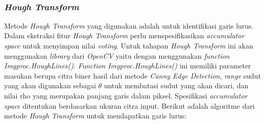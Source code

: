 \begin{enumerate}[leftmargin=16pt]
\begin{adjustbox}{width=1\textwidth}
\begin{minipage}{\linewidth}
			\label{fig:HasilDeteksiTepi}
		\end{minipage}
	\end{adjustbox}\\
\end{enumerate}

\subsubsection{\textit{Hough Transform}}
\noindent Metode \textit{Hough Transform} yang digunakan adalah untuk identifikasi garis lurus. Dalam ekstraksi fitur \textit{Hough Transform} perlu menspesifikasikan \textit{accumulator space} untuk menyimpan nilai \textit{voting}. Untuk tahapan \textit{Hough Transform} ini akan menggunakan \textit{library} dari \textit{OpenCV} yaitu dengan menggunakan \textit{function} \textit{Imgproc.HoughLines()}. \textit{Function} \textit{Imgproc.HoughLines()} ini memiliki parameter masukan berupa citra biner hasil dari metode \textit{Canny Edge Detection}, \textit{range} sudut yang akan digunakan sebagai $\theta$ untuk membatasi sudut yang akan dicari, dan  nilai rho yang merupakan panjang garis dalam piksel. Spesifikasi \textit{accumulator space} ditentukan berdasarkan ukuran citra input. Berikut adalah algoritme dari metode \textit{Hough Transform} untuk mendapatkan garis lurus:
